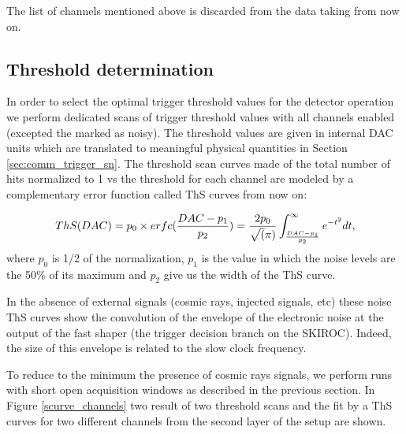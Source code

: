 \documentclass[a4paper,11pt]{article}
\begin{document}
The list of channels mentioned above is discarded from the data taking from now on.

\subsection{Threshold determination}
\label{sec:comm_trigger}

In order to select the optimal trigger threshold values for the detector operation
we perform dedicated scans of trigger threshold values
with all channels enabled (excepted the marked as noisy). 
The threshold values are given in internal DAC units which are translated to
meaningful physical quantities in Section \ref{sec:comm_trigger_sn}. 
The threshold scan curves made of the total number of hits normalized to 1 vs the threshold
for each channel are modeled by a complementary error function called ThS curves from now on:

\begin{equation}
ThS(DAC)=p_{0} \times erfc(\frac{DAC-p_{1}}{p_{2}}) = 
\newline
\frac{2p_{0}}{\sqrt(\pi)} \int_{\frac{DAC-p_{1}}{p_{2}}}^{\infty} e^{-t^{2}} dt,
\label{eq_S-curve}
\end{equation}
where $p_{0}$ is 1/2 of the normalization, $p_{1}$ is the value in which the noise levels are 
the 50\% of its maximum and $p_{2}$ give us the width of the ThS curve. 

In the absence of external signals (cosmic rays, injected signals, etc) 
these noise ThS curves show the convolution of the envelope of the 
electronic noise at the output of the fast shaper (the trigger decision branch on the SKIROC).
Indeed, the size of this envelope is related to the slow clock frequency.

To reduce to the minimum the presence of cosmic rays signals, 
we perform runs with short open acquisition windows
as described in the previous section.
In Figure \ref{scurve_channels} 
two result of two threshold scans and the fit by
a ThS curves for two different channels from the second layer of the setup are shown.
\end{document}
